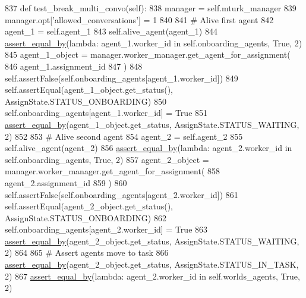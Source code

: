 \begin{DoxyCode}
837     \textcolor{keyword}{def }test\_break\_multi\_convo(self):
838         manager = self.mturk\_manager
839         manager.opt[\textcolor{stringliteral}{'allowed\_conversations'}] = 1
840 
841         \textcolor{comment}{# Alive first agent}
842         agent\_1 = self.agent\_1
843         self.alive\_agent(agent\_1)
844         \hyperlink{namespaceparlai_1_1mturk_1_1core_1_1test_1_1test__full__system_a0b463246d35658a2e422010f13dcf819}{assert\_equal\_by}(\textcolor{keyword}{lambda}: agent\_1.worker\_id \textcolor{keywordflow}{in} self.onboarding\_agents, \textcolor{keyword}{True}, 2)
845         agent\_1\_object = manager.worker\_manager.get\_agent\_for\_assignment(
846             agent\_1.assignment\_id
847         )
848         self.assertFalse(self.onboarding\_agents[agent\_1.worker\_id])
849         self.assertEqual(agent\_1\_object.get\_status(), AssignState.STATUS\_ONBOARDING)
850         self.onboarding\_agents[agent\_1.worker\_id] = \textcolor{keyword}{True}
851         \hyperlink{namespaceparlai_1_1mturk_1_1core_1_1test_1_1test__full__system_a0b463246d35658a2e422010f13dcf819}{assert\_equal\_by}(agent\_1\_object.get\_status, AssignState.STATUS\_WAITING, 2)
852 
853         \textcolor{comment}{# Alive second agent}
854         agent\_2 = self.agent\_2
855         self.alive\_agent(agent\_2)
856         \hyperlink{namespaceparlai_1_1mturk_1_1core_1_1test_1_1test__full__system_a0b463246d35658a2e422010f13dcf819}{assert\_equal\_by}(\textcolor{keyword}{lambda}: agent\_2.worker\_id \textcolor{keywordflow}{in} self.onboarding\_agents, \textcolor{keyword}{True}, 2)
857         agent\_2\_object = manager.worker\_manager.get\_agent\_for\_assignment(
858             agent\_2.assignment\_id
859         )
860         self.assertFalse(self.onboarding\_agents[agent\_2.worker\_id])
861         self.assertEqual(agent\_2\_object.get\_status(), AssignState.STATUS\_ONBOARDING)
862         self.onboarding\_agents[agent\_2.worker\_id] = \textcolor{keyword}{True}
863         \hyperlink{namespaceparlai_1_1mturk_1_1core_1_1test_1_1test__full__system_a0b463246d35658a2e422010f13dcf819}{assert\_equal\_by}(agent\_2\_object.get\_status, AssignState.STATUS\_WAITING, 2)
864 
865         \textcolor{comment}{# Assert agents move to task}
866         \hyperlink{namespaceparlai_1_1mturk_1_1core_1_1test_1_1test__full__system_a0b463246d35658a2e422010f13dcf819}{assert\_equal\_by}(agent\_2\_object.get\_status, AssignState.STATUS\_IN\_TASK, 2)
867         \hyperlink{namespaceparlai_1_1mturk_1_1core_1_1test_1_1test__full__system_a0b463246d35658a2e422010f13dcf819}{assert\_equal\_by}(\textcolor{keyword}{lambda}: agent\_2.worker\_id \textcolor{keywordflow}{in} self.worlds\_agents, \textcolor{keyword}{True}, 2)

\end{DoxyCode}
